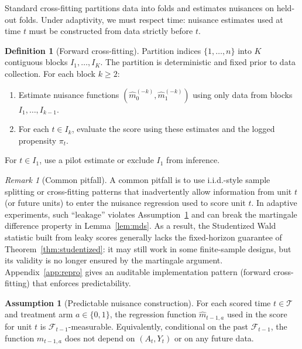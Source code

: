 \documentclass[11pt]{article}
\numberwithin{equation}{section}
\theoremstyle{plain}
\theoremstyle{definition}
\newtheorem{definition}[theorem]{Definition}
\newtheorem{assumption}[theorem]{Assumption}
\theoremstyle{remark}
\newtheorem{remark}[theorem]{Remark}
\newcommand{\pit}{\pi_t}
\newcommand{\mhat}{\widehat m}
\begin{document}
Standard cross-fitting partitions data into folds and estimates nuisances on held-out folds. Under adaptivity, we must respect time: nuisance estimates used at time $t$ must be constructed from data strictly before $t$.

\begin{definition}[Forward cross-fitting]\label{def:forward}
Partition indices $\{1, \ldots, n\}$ into $K$ contiguous blocks $I_1, \ldots, I_K$. The partition is deterministic and fixed prior to data collection. For each block $k \ge 2$:
\begin{enumerate}[leftmargin=2em, label=\arabic*.]
\item Estimate nuisance functions $(\mhat^{(-k)}_0, \mhat^{(-k)}_1)$ using only data from blocks $I_1, \ldots, I_{k-1}$.
\item For each $t \in I_k$, evaluate the score using these estimates and the logged propensity $\pit$.
\end{enumerate}
For $t \in I_1$, use a pilot estimate or exclude $I_1$ from inference.
\end{definition}

\begin{remark}[Common pitfall]\label{rem:predictability_cf}
A common pitfall is to use i.i.d.-style sample splitting or cross-fitting patterns that inadvertently allow information from unit $t$ (or future units) to enter the nuisance regression used to score unit $t$. In adaptive experiments, such ``leakage'' violates Assumption~\ref{ass:predictable_nuis} and can break the martingale difference property in Lemma~\ref{lem:mds}. As a result, the Studentized Wald statistic built from leaky scores generally lacks the fixed-horizon guarantee of Theorem~\ref{thm:studentized}: it may still work in some finite-sample designs, but its validity is no longer ensured by the martingale argument. Appendix~\ref{app:repro} gives an auditable implementation pattern (forward cross-fitting) that enforces predictability.
\end{remark}

\begin{assumption}[Predictable nuisance construction]\label{ass:predictable_nuis}
For each scored time $t\in\mathcal{T}$ and treatment arm $a\in\{0,1\}$, the regression function $\widehat m_{t-1,a}$ used in the score for unit $t$ is $\mathcal{F}_{t-1}$-measurable. Equivalently, conditional on the past $\mathcal{F}_{t-1}$, the function $\widehat m_{t-1,a}$ does not depend on $(A_t,Y_t)$ or on any future data.
\end{assumption}
\end{document}
